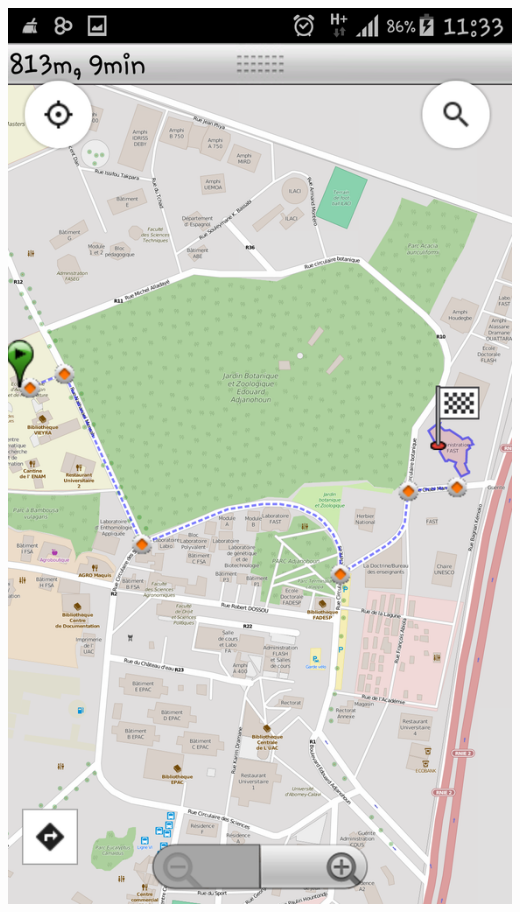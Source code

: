 \documentclass[11pt,handout]{beamer}
\begin{document}
\begin{frame}
			  \includegraphics[scale=0.1]{images/Itin_result.png}
		      \end{frame}
\end{document}
